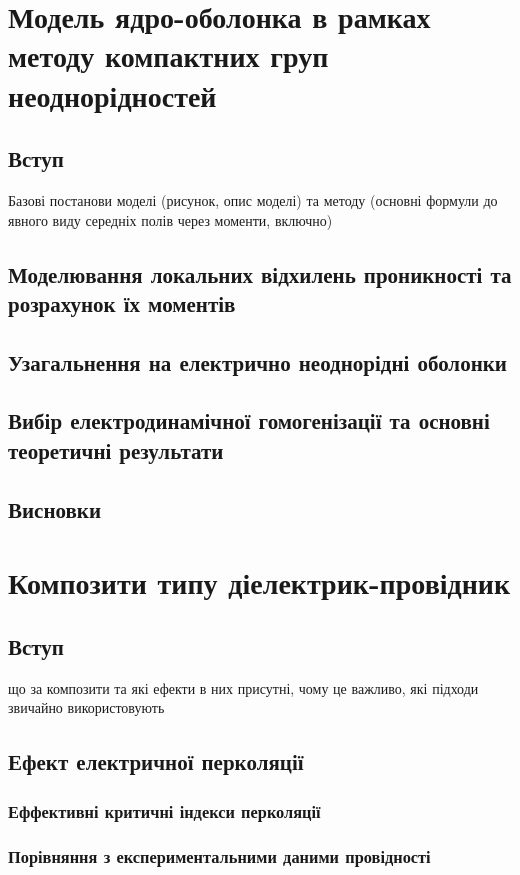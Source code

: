 \documentclass[12pt]{vakthesis}
\begin{document}
\chapter{Модель ядро-оболонка в рамках методу компактних груп неоднорідностей}%
\section{Вступ}
    Базові постанови моделі (рисунок, опис моделі) та методу
    (основні формули до явного виду середніх полів через моменти,
    включно)
\section{Моделювання локальних відхилень проникності та розрахунок їх моментів}
\section{Узагальнення на електрично неоднорідні оболонки}
\section{Вибір електродинамічної гомогенізації та основні теоретичні результати}
\section{Висновки}

\chapter{Композити типу діелектрик-провідник}%
\section{Вступ}
    що за композити та які ефекти в них присутні,
    чому це важливо, які підходи звичайно використовують
\section{Ефект електричної перколяції}
\subsection{Еффективні критичні індекси перколяції}
\subsection{Порівняння з експериментальними даними провідності}
\end{document}
